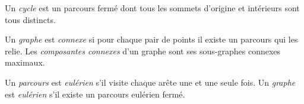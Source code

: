 \begin{mydef}
  Un \emph{cycle} est un parcours fermé dont tous les sommets d'origine et intérieurs sont tous distincts.
\end{mydef}

\begin{mydef}
  Un \emph{graphe} est \emph{connexe} si pour chaque pair de points il existe un parcours qui les relie. Les \emph{composantes connexes} d'un graphe sont ses sous-graphes connexes maximaux.
\end{mydef}

\begin{mydef}
  Un \emph{parcours} est \emph{eulérien} s'il visite chaque arête une et une seule fois. Un \emph{graphe} est \emph{eulérien} s'il existe un parcours eulérien fermé.
\end{mydef}

